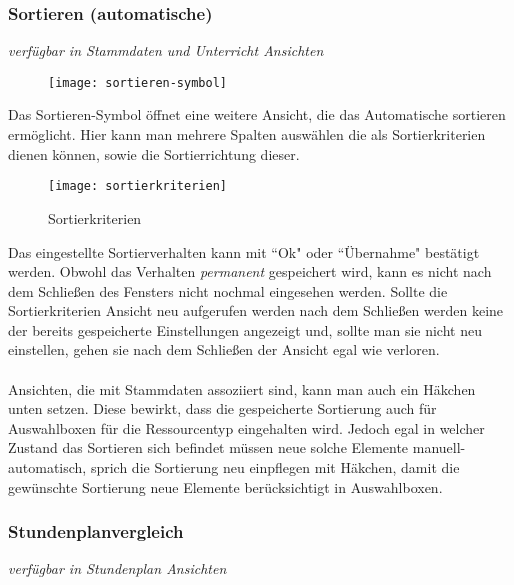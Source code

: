 \subsubsection{Sortieren (automatische)}
{\small\textit{verfügbar in Stammdaten und Unterricht Ansichten\\}\par}

\begin{wrapfigure}{r}{.05\textwidth}
	\vspace{-50pt}
	\texttt{[image: sortieren-symbol]}
	\vspace{-35pt}
\end{wrapfigure}

\noindent
Das Sortieren-Symbol öffnet eine weitere Ansicht, die das Automatische sortieren ermöglicht. Hier kann man mehrere Spalten auswählen die als Sortierkriterien dienen können, sowie die Sortierrichtung dieser.\\

\begin{wrapfigure}{r}{0.3\textwidth}
	\vspace{-24pt}
	\texttt{[image: sortierkriterien]}
	\vspace{-15pt}
	\caption{Sortierkriterien}
	\label{fig:sortierkriterien}
\end{wrapfigure}

\noindent
Das eingestellte Sortierverhalten kann mit ``Ok" oder ``Übernahme" bestätigt werden. Obwohl das Verhalten \textit{permanent} gespeichert wird, kann es nicht nach dem Schließen des Fensters nicht nochmal eingesehen werden. Sollte die Sortierkriterien Ansicht neu aufgerufen werden nach dem Schließen werden keine der bereits gespeicherte Einstellungen angezeigt und, sollte man sie nicht neu einstellen, gehen sie nach dem Schließen der Ansicht egal wie verloren.\\
\\
Ansichten, die mit Stammdaten assoziiert sind, kann man auch ein Häkchen unten setzen. Diese bewirkt, dass die gespeicherte Sortierung auch für Auswahlboxen für die Ressourcentyp eingehalten wird. Jedoch egal in welcher Zustand das Sortieren sich befindet müssen neue solche Elemente manuell-automatisch, sprich die Sortierung neu einpflegen mit Häkchen, damit die gewünschte Sortierung neue Elemente berücksichtigt in Auswahlboxen.\\

\subsubsection{Stundenplanvergleich}
{\small\textit{verfügbar in Stundenplan Ansichten\\}\par}

